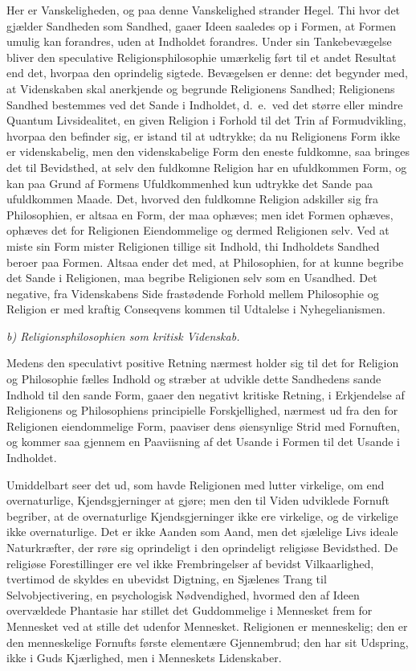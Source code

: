 \documentclass[12pt,a4paper]{article}
\begin{document}
Her er Vanskeligheden, og paa denne Vanskelighed strander
Hegel. Thi hvor det gjælder Sandheden som Sandhed, gaaer
Ideen saaledes op i Formen, at Formen umulig kan forandres,
uden at Indholdet forandres. Under sin Tankebevægelse bliver
den speculative Religionsphilosophie umærkelig ført til et
andet Resultat end det, hvorpaa den oprindelig sigtede.
Bevægelsen er denne: det begynder med, at Videnskaben skal
anerkjende og begrunde Religionens Sandhed; Religionens
Sandhed bestemmes ved det Sande i Indholdet, d.\ e.\ ved det
større eller mindre Quantum Livsidealitet, en given Religion i
Forhold til det Trin af Formudvikling, hvorpaa den befinder
sig, er istand til at udtrykke; da nu Religionens Form ikke er
videnskabelig, men den videnskabelige Form den eneste
fuldkomne, saa bringes det til Bevidsthed, at selv den
fuldkomne Religion har en ufuldkommen Form, og kan paa Grund
af Formens Ufuldkommenhed kun udtrykke det Sande paa
ufuldkommen Maade. Det, hvorved den fuldkomne Religion
adskiller sig fra Philosophien, er altsaa en Form, der maa
ophæves; men idet Formen ophæves, ophæves det for Religionen
Eiendommelige og dermed Religionen selv. Ved at miste sin Form
mister Religionen tillige sit Indhold, thi Indholdets Sandhed
beroer paa Formen. Altsaa ender det med, at Philosophien, for
at kunne begribe det Sande i Religionen, maa begribe Religionen
selv som en Usandhed. Det negative, fra Videnskabens Side
frastødende Forhold mellem Philosophie og Religion er med
kraftig Conseqvens kommen til Udtalelse i Nyhegelianismen.

\medskip

\noindent\textit{b) Religionsphilosophien som kritisk Videnskab.}

\medskip

Medens den speculativt positive Retning nærmest holder sig til
det for Religion og Philosophie fælles Indhold og stræber at
udvikle dette Sandhedens sande Indhold til den sande Form,
gaaer den negativt kritiske Retning, i Erkjendelse af
Religionens og Philosophiens principielle Forskjellighed,
nærmest ud fra den for Religionen eiendommelige Form, paaviser
dens øiensynlige Strid med Fornuften, og kommer saa gjennem en
Paaviisning af det Usande i Formen til det Usande i Indholdet.

Umiddelbart seer det ud, som havde Religionen med lutter
virkelige, om end overnaturlige, Kjendsgjerninger at gjøre; men
den til Viden udviklede Fornuft begriber, at de overnaturlige
Kjendsgjerninger ikke ere virkelige, og de virkelige ikke
overnaturlige. Det er ikke Aanden som Aand, men det sjælelige
Livs ideale Naturkræfter, der røre sig oprindeligt i den
oprindeligt religiøse Bevidsthed. De religiøse Forestillinger
ere vel ikke Frembringelser af bevidst Vilkaarlighed, tvertimod
de skyldes en ubevidst Digtning, en Sjælenes Trang til
Selvobjectivering, en psychologisk Nødvendighed, hvormed den af
Ideen overvældede Phantasie har stillet det Guddommelige i
Mennesket frem for Mennesket ved at stille det udenfor
Mennesket. Religionen er menneskelig; den er den menneskelige
Fornufts første elementære Gjennembrud; den har sit Udspring,
ikke i Guds Kjærlighed, men i Menneskets Lidenskaber.
\end{document}
